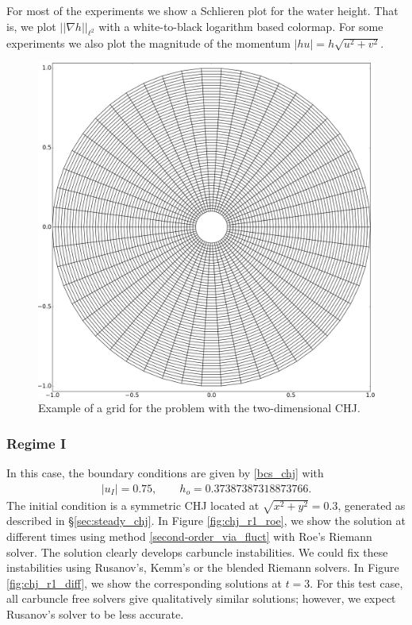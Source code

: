 \documentclass[preprint, 11pt]{article}
\newcommand{\bfu}{{u}}
\begin{document}
For most of the experiments we show a Schlieren plot for the water height.
That is, we plot $||\nabla h||_{\ell^2}$ with a white-to-black logarithm based colormap.
For some experiments we also plot the magnitude of the momentum $|h\bfu|=h\sqrt{u^2+v^2}$.

\begin{figure}[!h]
  \centering 
  \includegraphics[scale=0.15]{figures/mesh.png}
  \caption{
    Example of a grid for the problem with the two-dimensional CHJ.
    \label{fig:mesh_chj}}
\end{figure}

\subsubsection{Regime I}
In this case, the boundary conditions are given by \eqref{bcs_chj} with
\begin{align}\label{bcs_chj_r1}
  |\bfu_I|=0.75, \qquad h_o=0.37387387318873766. 
\end{align}
The initial condition is a symmetric CHJ located at $\sqrt{x^2+y^2}=0.3$, generated as described in \S \ref{sec:steady_chj}.
In Figure \ref{fig:chj_r1_roe}, we show the solution at different times using
method \eqref{second-order_via_fluct} with Roe's Riemann solver.
The solution clearly develops carbuncle instabilities.
We could fix these instabilities using Rusanov's, Kemm's or the blended Riemann solvers. 
In Figure \ref{fig:chj_r1_diff}, we show the corresponding solutions at $t=3$.
For this test case, all carbuncle free solvers give qualitatively similar solutions;
however, we expect Rusanov's solver to be less accurate. 
\end{document}
